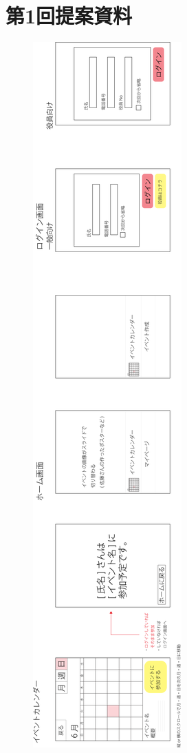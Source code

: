 \chapter{第1回提案資料}
\begin{figure}[h]
    \begin{center}
      \includegraphics[keepaspectratio, scale=0.22]{appendixs/appendixA-1.png}
    \end{center}
\end{figure}

